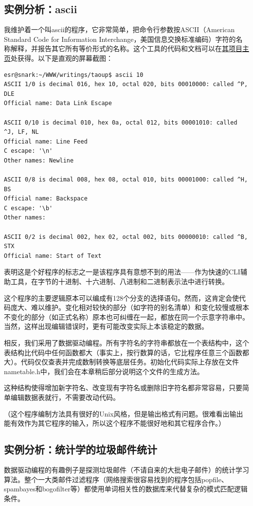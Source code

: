 \documentclass[12pt,oneside]{book}
\begin{document}
\subsection{实例分析：ascii}
我维护着一个叫ascii的程序，它非常简单，把命令行参数按ASCII（American Standard Code for Information Interchange，美国信息交换标准编码）字符的名称解释，并报告其它所有等价形式的名称。这个工具的代码和文档可以在\href{http://www.catb.org/~esr/ascii}{其项目主页}处获得。以下是直观的屏幕截图：

\begin{Verbatim}
esr@snark:~/WWW/writings/taoup$ ascii 10
ASCII 1/0 is decimal 016, hex 10, octal 020, bits 00010000: called ^P, DLE
Official name: Data Link Escape

ASCII 0/10 is decimal 010, hex 0a, octal 012, bits 00001010: called ^J, LF, NL
Official name: Line Feed
C escape: '\n'
Other names: Newline

ASCII 0/8 is decimal 008, hex 08, octal 010, bits 00001000: called ^H, BS
Official name: Backspace
C escape: '\b'
Other names:

ASCII 0/2 is decimal 002, hex 02, octal 002, bits 00000010: called ^B, STX
Official name: Start of Text
\end{Verbatim}

表明这是个好程序的标志之一是该程序具有意想不到的用法——作为快速的CLI辅助工具，在字节的十进制、十六进制、八进制和二进制表示法中进行转换。

这个程序的主要逻辑原本可以编成有128个分支的选择语句。然而，这肯定会使代码庞大、难以维护。变化相对较快的部分（如字符的别名清单）和变化较慢或根本不变化的部分（如正式名称）原本也可纠缠在一起，都放在同一个示意字符串中。当然，这样出现编辑错误时，更有可能改变实际上本该稳定的数据。

相反，我们采用了数据驱动编程。所有字符名的字符串都放在一个表结构中，这个表结构比代码中任何函数都大（事实上，按行数算的话，它比程序任意三个函数都大）。代码仅仅查表并完成数制转换等底层任务。初始化代码实际上存放在文件nametable.h中，我们会在本章稍后部分说明这个文件的生成方法。

这种结构使得增加新字符名、改变现有字符名或删除旧字符名都非常容易，只要简单编辑数据表就行，不需要改动代码。

（这个程序编制方法具有很好的Unix风格，但是输出格式有问题。很难看出输出能有效作为其它程序的输入，所以这个程序不能很好地和其它程序合作。）

\subsection{实例分析：统计学的垃圾邮件统计}
数据驱动编程的有趣例子是探测垃圾邮件（不请自来的大批电子邮件）的统计学习算法。整个一大类邮件过滤程序（网络搜索很容易找到的程序包括popfile、spambayes和bogofilter等）都使用单词相关性的数据库来代替复杂的模式匹配逻辑条件。
\end{document}
